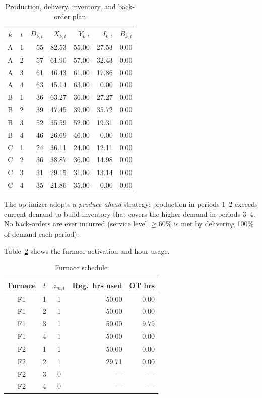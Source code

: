 \documentclass[11pt,a4paper]{article}
\begin{document}
\begin{table}[H]
\centering
\caption{Production, delivery, inventory, and back-order plan}
\label{tab:production}
\small
\begin{tabular}{ccrrrrr}
\toprule
$k$ & $t$ & $D_{k,t}$ & $X_{k,t}$ & $Y_{k,t}$ & $I_{k,t}$ & $B_{k,t}$ \\
\midrule
A & 1 & 55 & 82.53 & 55.00 & 27.53 & 0.00 \\
A & 2 & 57 & 61.90 & 57.00 & 32.43 & 0.00 \\
A & 3 & 61 & 46.43 & 61.00 & 17.86 & 0.00 \\
A & 4 & 63 & 45.14 & 63.00 & 0.00  & 0.00 \\
\midrule
B & 1 & 36 & 63.27 & 36.00 & 27.27 & 0.00 \\
B & 2 & 39 & 47.45 & 39.00 & 35.72 & 0.00 \\
B & 3 & 52 & 35.59 & 52.00 & 19.31 & 0.00 \\
B & 4 & 46 & 26.69 & 46.00 & 0.00  & 0.00 \\
\midrule
C & 1 & 24 & 36.11 & 24.00 & 12.11 & 0.00 \\
C & 2 & 36 & 38.87 & 36.00 & 14.98 & 0.00 \\
C & 3 & 31 & 29.15 & 31.00 & 13.14 & 0.00 \\
C & 4 & 35 & 21.86 & 35.00 & 0.00  & 0.00 \\
\bottomrule
\end{tabular}
\end{table}

The optimizer adopts a \emph{produce-ahead} strategy: production in periods
1--2 exceeds current demand to build inventory that covers the higher demand
in periods 3--4.  No back-orders are ever incurred (service level $\geq 60\%$
is met by delivering 100\% of demand each period).

\medskip
Table~\ref{tab:furnace} shows the furnace activation and hour usage.

\begin{table}[H]
\centering
\caption{Furnace schedule}
\label{tab:furnace}
\begin{tabular}{cccrr}
\toprule
Furnace & $t$ & $z_{m,t}$ & Reg.\ hrs used & OT hrs \\
\midrule
F1 & 1 & 1 & 50.00 & 0.00 \\
F1 & 2 & 1 & 50.00 & 0.00 \\
F1 & 3 & 1 & 50.00 & 9.79 \\
F1 & 4 & 1 & 50.00 & 0.00 \\
\midrule
F2 & 1 & 1 & 50.00 & 0.00 \\
F2 & 2 & 1 & 29.71 & 0.00 \\
F2 & 3 & 0 & ---   & ---  \\
F2 & 4 & 0 & ---   & ---  \\
\bottomrule
\end{tabular}
\end{table}
\end{document}
